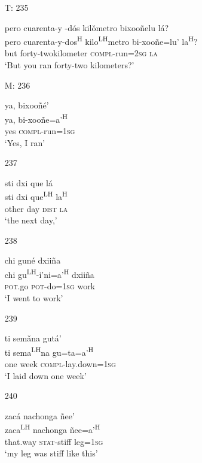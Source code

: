 \begin{itemize}
\item[T: 235]
 
pero cuarenta-y -d\'{o}s kil\v{o}metro bixoo\~{n}elu l\'{a}?\\
pero cuarenta-y-dos\textsuperscript{H} kilo\textsuperscript{LH}metro bi-xoo\~{n}e=lu' la\textsuperscript{H}?\\
but forty-twokilometer \textsc{compl}-run=\textsc{2sg} \textsc{la}\\
\glt `But you ran forty-two kilometers?'
 

\item[M: 236]
 
\glll   ya, bixoo\~{n}\'{e}'\\
 ya, bi-xoo\~{n}e=a'\textsuperscript{H}\\
yes \textsc{compl}-run=\textsc{1sg}\\
\glt `Yes, I ran'
 



\item[237]

\glll   sti dxi que l\'{a}\\
 sti dxi que\textsuperscript{LH} la\textsuperscript{H}\\
other day \textsc{dist} \textsc{la}\\
\glt `the next day,'
 

\item[238]
 
\glll   chi gun\'{e} dxii\~{n}a\\
  chi gu\textsuperscript{LH}-i'ni=a'\textsuperscript{H} dxii\~{n}a\\
\textsc{pot}.go \textsc{pot}-do=\textsc{1sg} work\\
\glt `I went to work'
 



\item[239]
 
\glll   ti sem\v{a}na gut\'{a}'\\
 ti sema\textsuperscript{LH}na gu=ta=a'\textsuperscript{H}\\
one week \textsc{compl}-lay.down=\textsc{1sg}\\
\glt `I laid down one week' 
 


\item[240]
 
\glll  zac\'{a} nachonga \~{n}ee'\\
zaca\textsuperscript{LH} nachonga \~{n}ee=a'\textsuperscript{H}\\
that.way \textsc{stat}-stiff leg=\textsc{1sg}\\
\glt `my leg was stiff like this'
 



\end{itemize}
